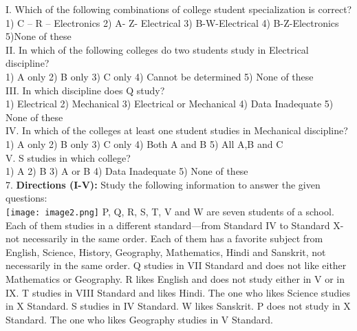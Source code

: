 \documentclass[
]{article}
\begin{document}
I. Which of the following combinations of college student specialization is correct?\\
1) C – R – Electronics \hspace{2mm}2) A- Z- Electrical \hspace{2mm}3) B-W-Electrical
\hspace{2mm}4) B-Z-Electronics \hspace{2mm}5)None of these\\

II. In which of the following colleges do two students study in Electrical discipline?\\
1) A only \hspace{2mm}2) B only \hspace{2mm}3) C only
\hspace{2mm}4) Cannot be determined \hspace{2mm}5) None of these\\

III. In which discipline does Q study?\\
1) Electrical \hspace{2mm}2) Mechanical
\hspace{2mm}3) Electrical or Mechanical \hspace{2mm}4) Data Inadequate
\hspace{2mm}5) None of these\\

IV. In which of the colleges at least one student studies in Mechanical discipline?\\
1) A only \hspace{2mm}2) B only \hspace{2mm}3) C only
\hspace{2mm}4) Both A and B \hspace{2mm}5) All A,B and C\\

V. S studies in which college?\\
1) A \hspace{2mm}2) B \hspace{2mm}3) A or B
\hspace{2mm}4) Data Inadequate \hspace{2mm}5) None of these\\

7. \textbf{Directions (I-V):} Study the following information to answer the given questions:\\
\texttt{[image: image2.png]}
P, Q, R, S, T, V and W are seven students of a school. Each of them studies in a different
standard—from Standard IV to Standard X-not necessarily in the same order. Each of them
has a favorite subject from English, Science, History, Geography, Mathematics, Hindi and
Sanskrit, not necessarily in the same order.
Q studies in VII Standard and does not like either Mathematics or Geography. R likes
English and does not study either in V or in IX. T studies in VIII Standard and likes Hindi.
The one who likes Science studies in X Standard. S studies in IV Standard. W likes Sanskrit.
P does not study in X Standard. The one who likes Geography studies in V Standard.\\
\end{document}
